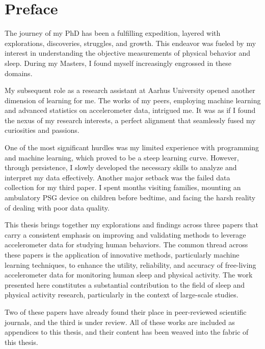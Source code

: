 \documentclass[
  8pt,
  letterpaper,
  DIV=11,
  numbers=noendperiod]{scrartcl}
\author{}
\date{}
\renewcommand*\contentsname{Table of contents}
\newcommand\contentsname{Table of contents}
\begin{document}
\renewcommand*\contentsname{Table of contents}
{
\hypersetup{linkcolor=}
\setcounter{tocdepth}{3}
\tableofcontents
}
\newpage

\hypertarget{preface}{%
\section{Preface}\label{preface}}

The journey of my PhD has been a fulfilling expedition, layered with
explorations, discoveries, struggles, and growth. This endeavor was
fueled by my interest in understanding the objective measurements of
physical behavior and sleep. During my Masters, I found myself
increasingly engrossed in these domains.

My subsequent role as a research assistant at Aarhus University opened
another dimension of learning for me. The works of my peers, employing
machine learning and advanced statistics on accelerometer data,
intrigued me. It was as if I found the nexus of my research interests, a
perfect alignment that seamlessly fused my curiosities and passions.

One of the most significant hurdles was my limited experience with
programming and machine learning, which proved to be a steep learning
curve. However, through persistence, I slowly developed the necessary
skills to analyze and interpret my data effectively. Another major
setback was the failed data collection for my third paper. I spent
months visiting families, mounting an ambulatory PSG device on children
before bedtime, and facing the harsh reality of dealing with poor data
quality.

This thesis brings together my explorations and findings across three
papers that carry a consistent emphasis on improving and validating
methods to leverage accelerometer data for studying human behaviors. The
common thread across these papers is the application of innovative
methods, particularly machine learning techniques, to enhance the
utility, reliability, and accuracy of free-living accelerometer data for
monitoring human sleep and physical activity. The work presented here
constitutes a substantial contribution to the field of sleep and
physical activity research, particularly in the context of large-scale
studies.

Two of these papers have already found their place in peer-reviewed
scientific journals, and the third is under review. All of these works
are included as appendices to this thesis, and their content has been
weaved into the fabric of this thesis.
\end{document}
